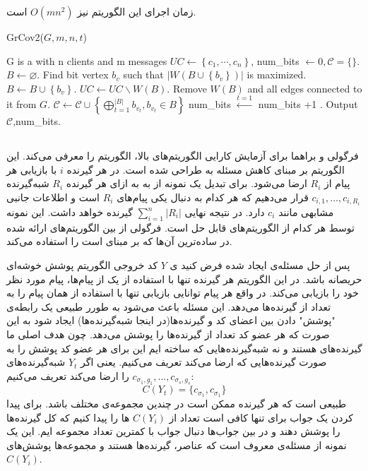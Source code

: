  زمان اجرای این الگوریتم نیز
 $O(mn^2)$
 است.
 	\begin{algorithm}[H]
 	\caption{GrCov2($G,m,n,t$) \cite{pliablefirstpaper}}
 	\label{algorithm:grcov2}
 	\begin{algorithmic}[1]
 		\State G is a \picodt with n clients and m messages
 		\State  $U C \leftarrow\left\{c_1, \cdots, c_n\right\}$,
 		\State  num\_bits $\leftarrow 0, \mathcal{C}=\{\}$.
		 		\State $B \leftarrow \varnothing$.
				 		\State  Find bit vertex $b_v$ such that $\left|W\left(B \cup\left\{b_v\right\}\right)\right|$ is maximized.
				 		\State  $B \leftarrow B \cup\left\{b_v\right\}$.
		 		\EndWhile
		 		\State  $UC \leftarrow UC \backslash W(B)$.
		 		\State Remove $W(B)$ and all edges connected to it from $G$.
		 		\State  $\mathcal{C} \leftarrow \mathcal{C} \cup\left\{\bigoplus_{t=1}^{|B|} b_{v_t}, b_{v_t} \in B\right\}$
		 		\State  num\_bits $\stackrel{t=1}{\leftarrow}$ num\_bits +1 .
 		\EndWhile
 		\State  Output $\mathcal{C}$,num\_bits.
 	\end{algorithmic}
 \end{algorithm} 
 \subsection{}
 فرگولی و براهما برای آزمایش کارایی الگوریتم‌های بالا، الگوریتم
 را معرفی می‌کند. این الگوریتم بر مبنای کاهش مسئله به
 \icod
 طراحی شده است. در 
 \picod
 هر گیرنده 
 $i$
 با بازیابی هر پیام از
 $R_i$
 ارضا می‌شود. برای تبدیل یک نمونه از
 \picod
 به
 \icod
 به ازای هر گیرنده
 $R_i$
 شبه‌گیرنده 
 $c_{i, 1}, \ldots, c_{i, {R_i}}$
 قرار می‌دهیم که هر کدام به دنبال یکی پیام‌های
 $R_i$
 است و اطلاعات جانبی مشابهی مانند
 $c_i$
 دارد. در نتیجه 
 \icod
 نهایی 
 $\sum\limits_{i = 1}^{n} |R_i|$
 گیرنده خواهد داشت. این نمونه توسط هر کدام از الگوریتم‌های
 \icod
 قابل حل است. فرگولی از بین الگوریتم‌های ارائه شده در
 \cite{25}
 ساده‌ترین آن‌ها که بر مبنای
 است را استفاده می‌کند.
 
 پس از حل مسئله‌ی
 \icod
 ایجاد شده فرض کنید ی
 $Y$
 کد خروجی الگوریتم پوشش خوشه‌ای حریصانه باشد. در این الگوریتم هر گیرنده تنها با استفاده از یک از پیام‌ها، پیام مورد نظر خود را بازیابی می‌کند. در واقع هر پیام توانایی بازیابی تنها با استفاده از همان پیام را به تعداد از گیرنده‌ها می‌دهد. این مسئله باعث می‌شود به طورر طبیعی یک رابطه‌ی "پوشش" دادن بین اعضای کد و گیرنده‌ها(در اینجا شبه‌گیرنده‌ها) ایجاد شود به این صورت که هر عضو کد تعداد از گیرنده‌ها را پوشش می‌دهد. چون هدف اصلی ما گیرنده‌های
 \picod
 هستند و نه شبه‌گیرنده‌هایی که ساخته ایم این برای هر عضو کد پوشش را به صورت گیرنده‌هایی که ارضا می‌کند تعریف می‌کنیم. یعنی اگر
 $Y_t$
 شبه‌گیرنده‌های
 $c_{\sigma_1, g_1}, \ldots, c_{\sigma_s, g_s}$
 را ارضا می‌کند تعریف می‌کنیم:
 $$C(Y_t) =\{ c_{\sigma_1}, c_{\sigma_1}\}$$
 طبیعی است که هر گیرنده ممکن است در چندین مجموعه‌ی مختلف باشد. برای پیدا کردن یک جواب برای
 \picod
 تنها کافی است تعداد از 
 $C(Y_i)$
 ها را پیدا کنیم که کل گیرنده‌ها را پوشش دهند و در بین جواب‌ها دنبال جواب با کمترین تعداد مجموعه‌ ایم. این یک نمونه از مسئله‌ی معروف
 است که عناصر، گیرنده‌ها هستند و مجموعه‌ها پوشش‌های
 $C(Y_i)$.
 
